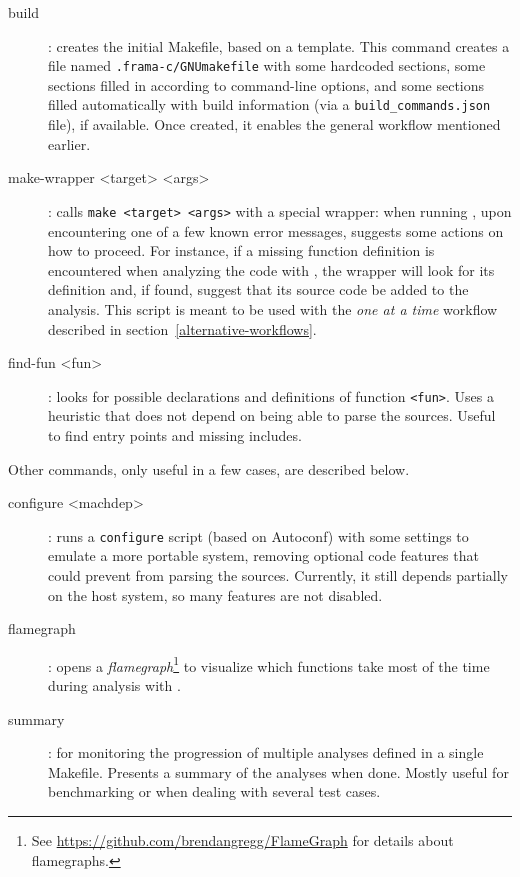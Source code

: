 \begin{description}
\item[build]: creates the initial Makefile, based on a template.
  This command creates a file named \texttt{.frama-c/GNUmakefile} with some
  hardcoded sections, some sections filled in according to command-line
  options, and some sections filled automatically with build information
  (via a \texttt{build\_commands.json} file), if available.
  Once created, it enables the general workflow mentioned earlier.
\item[make-wrapper <target> <args>]: calls \texttt{make <target> <args>} with
  a special wrapper: when running \Value, upon encountering one of a few known
  error messages, suggests some actions on how to proceed.
  For instance, if a missing function definition is encountered when analyzing
  the code with \Value, the wrapper will look for its definition and, if found,
  suggest that its source code be added to the analysis. This script is meant
  to be used with the {\em one at a time} workflow described in
  section~\ref{alternative-workflows}.
\item[find-fun <fun>]: looks for possible declarations and definitions
  of function \texttt{<fun>}. Uses a heuristic that does not depend on \FramaC
  being able to parse the sources. Useful to find entry points and missing
  includes.
\end{description}

Other commands, only useful in a few cases, are described below.

\begin{description}
\item[configure <machdep>]: runs a \texttt{configure}
  script (based on Autoconf) with some settings to emulate a more portable
  system, removing optional code features that could prevent \FramaC from
  parsing the sources. Currently, it still depends partially on the host system,
  so many features are not disabled.
\item[flamegraph]: opens a {\em flamegraph}\footnote{%
  See \url{https://github.com/brendangregg/FlameGraph} for details about
  flamegraphs.} to visualize which functions take most of the time
  during analysis with \Value.
\item[summary]: for monitoring the progression of multiple analyses defined
  in a single Makefile. Presents a summary of the analyses when done. Mostly
  useful for benchmarking or when dealing with several test cases.
\end{description}

